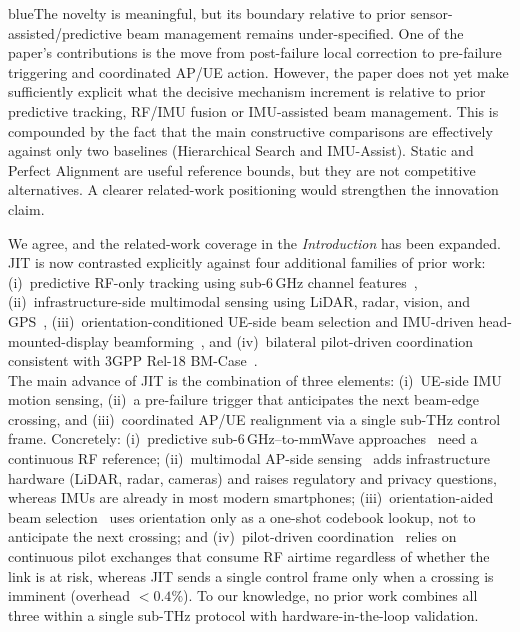 \documentclass{article}
\newcommand{\blue}[1]{\begin{color}{blue}#1\end{color}}
\begin{document}
\begin{tcbremark}
{\selectfont
\blue{The novelty is meaningful, but its boundary relative to prior sensor-assisted/predictive beam management remains under-specified. One of the paper's contributions is the move from post-failure local correction to pre-failure triggering and coordinated AP/UE action. However, the paper does not yet make sufficiently explicit what the decisive mechanism increment is relative to prior predictive tracking, RF/IMU fusion or IMU-assisted beam management. This is compounded by the fact that the main constructive comparisons are effectively against only two baselines (Hierarchical Search and IMU-Assist). Static and Perfect Alignment are useful reference bounds, but they are not competitive alternatives. A clearer related-work positioning would strengthen the innovation claim.}
}
\end{tcbremark}

\noindent We agree, and the related-work coverage in the \emph{Introduction} has been expanded. JIT is now contrasted explicitly against four additional families of prior work: (i)~predictive RF-only tracking using sub-6\,GHz channel features~\cite{Alrabeiah2020DeepLearning}, (ii)~infrastructure-side multimodal sensing using LiDAR, radar, vision, and GPS~\cite{Alkhateeb2023DeepSense, Jiang2023LiDAR, Morais2023Position}, (iii)~orientation-conditioned UE-side beam selection and IMU-driven head-mounted-display beamforming~\cite{Rezaie2022Orientation, Struye2023CoVRage}, and (iv)~bilateral pilot-driven coordination consistent with 3GPP Rel-18 BM-Case~\cite{Alkhateeb2018DLCB, Xue2023Standardization, Heng2021SixChallenges}.\\

\noindent The main advance of JIT is the combination of three elements: (i)~UE-side IMU motion sensing, (ii)~a pre-failure trigger that anticipates the next beam-edge crossing, and (iii)~coordinated AP/UE realignment via a single sub-THz control frame. Concretely: (i)~predictive sub-6\,GHz–to-mmWave approaches~\cite{Alrabeiah2020DeepLearning} need a continuous RF reference; (ii)~multimodal AP-side sensing~\cite{Alkhateeb2023DeepSense, Jiang2023LiDAR, Morais2023Position} adds infrastructure hardware (LiDAR, radar, cameras) and raises regulatory and privacy questions, whereas IMUs are already in most modern smartphones; (iii)~orientation-aided beam selection~\cite{Rezaie2022Orientation, Struye2023CoVRage} uses orientation only as a one-shot codebook lookup, not to anticipate the next crossing; and (iv)~pilot-driven coordination~\cite{Alkhateeb2018DLCB, Xue2023Standardization} relies on continuous pilot exchanges that consume RF airtime regardless of whether the link is at risk, whereas JIT sends a single control frame only when a crossing is imminent (overhead $<0.4\%$). To our knowledge, no prior work combines all three within a single sub-THz protocol with hardware-in-the-loop validation.\\
\end{document}
